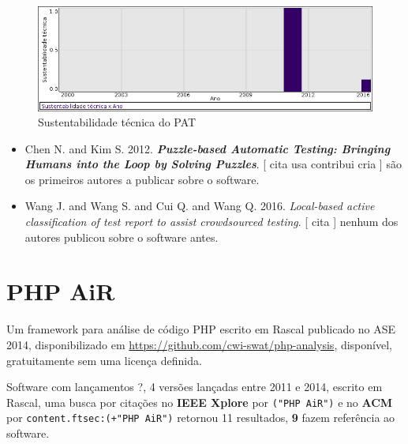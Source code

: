 \begin{figure}[h]
  \center
  \includegraphics[scale=0.50]{imagens/softwares-charts/pat.png}
  \caption{Sustentabilidade técnica do PAT}
\end{figure}


\begin{itemize}
\item Chen N. and Kim S.
      2012.
        \textbf{\textit{ Puzzle-based Automatic Testing: Bringing Humans into the Loop by Solving Puzzles}}.
      [
          cita
          usa
          contribui
          cria
      ]
são os primeiros autores a publicar sobre o software.
\item Wang J. and Wang S. and Cui Q. and Wang Q.
      2016.
        \textit{ Local-based active classification of test report to assist crowdsourced testing}.
      [
          cita
      ]
nenhum dos autores publicou sobre o software antes.
\end{itemize}
\section{PHP AiR}

Um framework para análise de código PHP escrito em Rascal
publicado no ASE 2014,
disponibilizado em \url{https://github.com/cwi-swat/php-analysis},
disponível,
gratuitamente
sem uma licença definida.

Software com lançamentos ?,
4 versões lançadas
entre 2011 e 2014,
escrito em Rascal,
uma busca por citações no {\bf IEEE Xplore} por
\texttt{("PHP AiR")}
e no {\bf ACM} por
\texttt{content.ftsec:(+"PHP AiR")}
retornou
11 resultados,
{\bf 9} fazem referência ao software.


